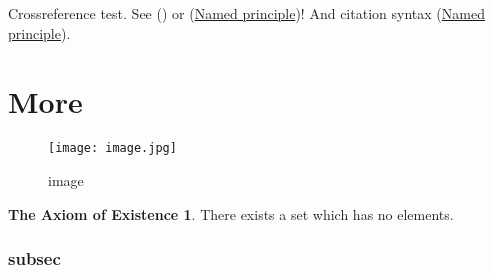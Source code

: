 \documentclass[
]{article}
\theoremstyle{definition}
\theoremstyle{plain}
\theoremstyle{empty}
\newtheorem*{statement}{}
\theoremstyle{definition}
\newtheorem*{the_axiom_of_existence}{The Axiom of Existence}
\theoremstyle{plain}
\theoremstyle{definition}
\theoremstyle{plain}
\theoremstyle{definition}
\theoremstyle{plain}
\theoremstyle{definition}
\begin{document}

Crossreference test. See (\protect\hyperlink{NP}{}) or
(\protect\hyperlink{named-principle}{Named principle})! And citation
syntax (\protect\hyperlink{named-principle}{Named principle}).

\hypertarget{more}{%
\section{More}\label{more}}

\begin{figure}
\hypertarget{no-statement}{%
\centering
\texttt{[image: image.jpg]}
\caption{image}\label{no-statement}
}
\end{figure}

\begin{the_axiom_of_existence}

\protect\hypertarget{ax:existence}{}{}There exists a set which has no
elements.

\end{the_axiom_of_existence}

\hypertarget{subsec}{%
\subsubsection{subsec}\label{subsec}}
\end{document}
